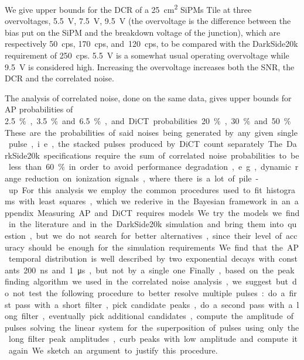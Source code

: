 \documentclass[11pt]{article}
\begin{document}
    We give upper bounds for the DCR of a \SI{25}{cm^2} SiPMs Tile at three
    overvoltages, \SI{5.5}{V}, \SI{7.5}{V}, \SI{9.5}{V} (the overvoltage is the
    difference between the bias put on the SiPM and the breakdown voltage of
    the junction), which are respectively \SI{50}{cps}, \SI{170}{cps},
    and~\SI{120}{cps}, to be compared with the DarkSide20k requirement of
    \SI{250}{cps}. \SI{5.5}{V} is a somewhat usual operating overvoltage while
    \SI{9.5}{V} is considered high. Increasing the overvoltage increases both
    the SNR, the DCR and the correlated noise.
    
    The analysis of correlated noise, done on the same data, gives upper bounds
    for AP probabilities of \SI{2.5}\%, \SI{3.5}\% and \SI{6.5}\%, and DiCT
    probabilities \SI{20}\%, \SI{30}\% and~\SI{50}\%. These are the
    probabilities of said noises being generated by any given single pulse,
    i.e., the stacked pulses produced by DiCT count separately. The DarkSide20k
    specifications require the sum of correlated noise probabilities to be less
    than \SI{60}\% in order to avoid performance degradation, e.g., dynamic
    range reduction on ionization signals, where there is a lot of pile-up. For
    this analysis we employ the common procedures used to fit histograms with
    least squares, which we rederive in the Bayesian framework in an appendix.
    
    Measuring AP and DiCT requires models. We try the models we find in the
    literature and in the DarkSide20k simulation and bring them into question,
    but we do not search for better alternatives, since their level of accuracy
    should be enough for the simulation requirements. We find that the AP
    temporal distribution is well described by two exponential decays with
    constants \SI{200}{ns} and \SI{1}{\micro s}, but not by a single one.
    
    Finally, based on the peak finding algorithm we used in the correlated
    noise analysis, we suggest but do not test the following procedure to
    better resolve multiple pulses: do a first pass with a short filter, pick
    candidate peaks, do a second pass with a long filter, eventually pick
    additional candidates, compute the amplitude of pulses solving the linear
    system for the superposition of pulses using only the long filter peak
    amplitudes, curb peaks with low amplitude and compute it again. We sketch
    an argument to justify this procedure.
\end{document}
